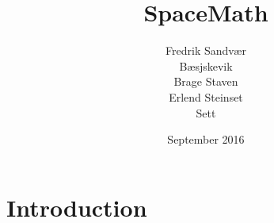 \documentclass{article}
\title{SpaceMath}
\author{
  Fredrik Sandvær\\
  Bæsjskevik\\
  Brage Staven\\
  Erlend Steinset\\ Sett
}
\date{September 2016}
\begin{document}
\maketitle

\section{Introduction}
\end{document}

